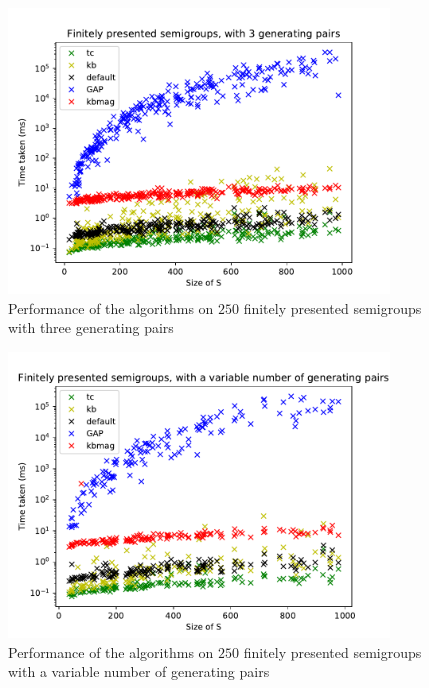 \begin{figure}[p]
  \centering
  \includegraphics[width=0.9\textwidth]{pics/ch-pairs/bench-fp-3p-times}
  \caption[Benchmark: all algorithms, finitely presented, 3 pairs]
  {Performance of the algorithms on $250$ finitely presented semigroups
    with three generating pairs}
  \label{fig:bench-fp-3p-times}
\end{figure}

\begin{figure}[p]
  \centering
  \includegraphics[width=0.9\textwidth]{pics/ch-pairs/bench-fp-vp-times}
  \caption[Benchmark: all algorithms, finitely presented, $n$ pairs]
  {Performance of the algorithms on $250$ finitely presented semigroups
    with a variable number of generating pairs}
  \label{fig:bench-fp-vp-times}
\end{figure}

